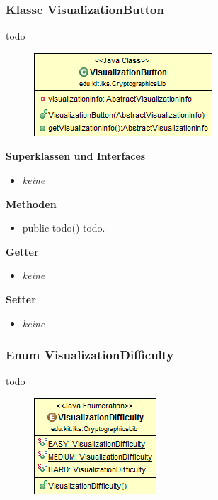 \documentclass{article}
\begin{document}
	\subsubsection{Klasse VisualizationButton}
	  todo
	
      \begin{figure}[H]
        \centering
        \includegraphics{resources/edu-kit-iks-CryptographicsLib-VisualizationButton}
      \end{figure}
	
      \textbf{Superklassen und Interfaces}
      \begin{itemize}
        \item \textit{keine}
      \end{itemize}
	
      \textbf{Methoden}
      \begin{itemize}
        \item public todo() \newline
          todo.
      \end{itemize}
      
      \textbf{Getter}
      \begin{itemize}
		\item \textit{keine}
      \end{itemize}
      
      \textbf{Setter}
      \begin{itemize}
        \item \textit{keine}
      \end{itemize}
	
	\subsubsection{Enum VisualizationDifficulty}
	  todo
	
      \begin{figure}[H]
        \centering
        \includegraphics{resources/edu-kit-iks-CryptographicsLib-VisualizationDifficulty}
      \end{figure}
\end{document}

